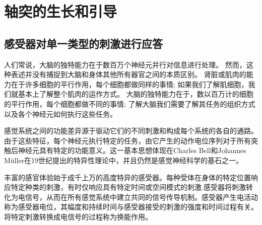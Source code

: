 \chapter{轴突的生长和引导}


\section{感受器对单一类型的刺激进行应答}
人们常说，大脑的独特能力在于数百万个神经元并行对信息进行处理。
然而，这种表述并没有捕捉到大脑和身体其他所有器官之间的本质区别。
肾脏或肌肉的能力在于许多细胞的平行作用，每个细胞都做同样的事情; 
如果我们了解肌细胞，我们就基本上了解整个肌肉的运作方式。
大脑的独特能力在于，数以百万计的细胞的平行作用，每个细胞都做不同的事情; 
了解大脑我们需要了解其任务的组织方式以及各个神经元如何执行这些任务。

感觉系统之间的功能差异源于驱动它们的不同刺激和构成每个系统的各自的通路。由于这些特征，每个神经元执行特定的任务，由它产生的动作电位序列对于所有突触后神经元具有特定的功能意义。这一基本思想体现在Charles Bell和Johannes Müller在19世纪提出的特异性理论中，并且仍然是感觉神经科学的基石之一。

丰富的感官体验始于成千上万的高度特异的感受器。每种受体在身体的特定位置响应特定种类的刺激，有时仅响应具有特定时间或空间模式的刺激.感受器将刺激转化为电信号，从而在所有感觉系统中建立共同的信号传导机制。感受器产生电活动称为感受器电位，其幅度和持续时间与感受器接受的刺激的强度和时间过程有关。将特定刺激转换成电信号的过程称为换能作用。

